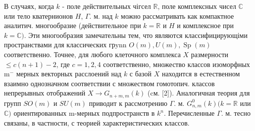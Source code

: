 \documentclass[10pt]{article}
\begin{document}
В случаях, когда $k$ - поле действительных чігсел $\mathbb{R}$, поле комплексных чисел $\mathbb{C}$ или тело кватернионов $H$, $\Gamma$. м. над $k$ можно рассматривать как компактное аналитич. многообразие (действительное при $k=\mathbb{R}$ и $H$ и комплексное при $k=\mathbb{C})$. Эти многообразия замечательны тем, что являются классифицирующіми пространствами для классических грynn $O(m), U(m), \operatorname{Sp}(m)$ соответственно. Точнее, для любого клеточного комплекса $X$ размерности $\leqslant c(n+1)-2$, где $c=1,2,4$ соответственно, множество классов изоморфных $\mathrm{m}^{-}$ мерных векторных расслоений над $k$ с базой $X$ находится в естественном взаимно однозначном соответствии с множеством гомотопич. классов непрерывных отображений $X \rightarrow G_{n+m, m}(k)$ (cм. [2]). Аналогичная теория для групп $S O(m)$ и $S U(m)$ приводит к рассмотрению $\Gamma$. м. $G_{n, m}^{0}(k)(k=\mathbb{R}$ или $\mathbb{C})$ ориентированных m-мерных подпространств в $k^{n}$. Перечисленные $\Gamma$. м. тесно связаны, в частности, с теорией характеристических классов.
\end{document}
